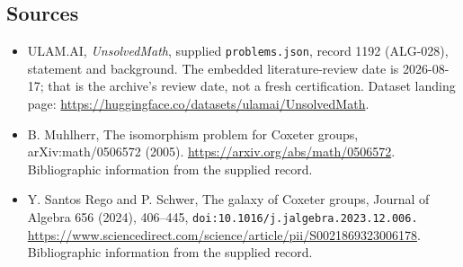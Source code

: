 \documentclass[11pt,a4paper]{article}
\begin{document}
\subsection{Sources}

{\small

\begin{itemize}

\item[\hypertarget{source:1192:1}{S1}] ULAM.AI, \emph{UnsolvedMath}, supplied \texttt{problems.json}, record 1192 (ALG-028), statement and background. The embedded literature-review date is 2026-08-17; that is the archive’s review date, not a fresh certification. Dataset landing page: \url{https://huggingface.co/datasets/ulamai/UnsolvedMath}.

\item[\hypertarget{source:1192:2}{S2}] B. Muhlherr, The isomorphism problem for Coxeter groups, arXiv:math/0506572 (2005). \url{https://arxiv.org/abs/math/0506572}. Bibliographic information from the supplied record.

\item[\hypertarget{source:1192:3}{S3}] Y. Santos Rego and P. Schwer, The galaxy of Coxeter groups, Journal of Algebra 656 (2024), 406--445, \nolinkurl{doi:10.1016/j.jalgebra.2023.12.006.} \url{https://www.sciencedirect.com/science/article/pii/S0021869323006178}. Bibliographic information from the supplied record.

\end{itemize}

}

\label{end:1192}
\end{document}
